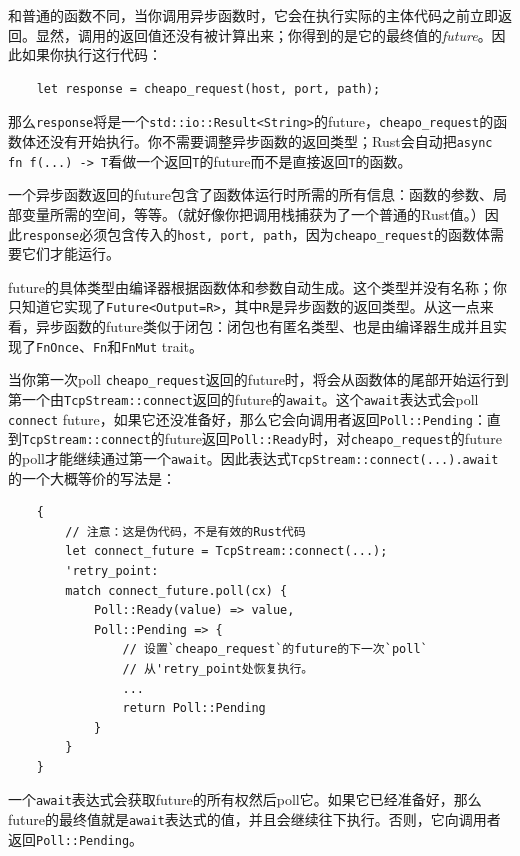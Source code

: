 和普通的函数不同，当你调用异步函数时，它会在执行实际的主体代码之前立即返回。显然，调用的返回值还没有被计算出来；你得到的是它的最终值的\emph{future}。因此如果你执行这行代码：
\begin{verbatim}
    let response = cheapo_request(host, port, path);
\end{verbatim}

那么\texttt{response}将是一个\texttt{std::io::Result<String>}的future，\texttt{cheapo\_request}的函数体还没有开始执行。你不需要调整异步函数的返回类型；Rust会自动把\texttt{async fn f(...) -> T}看做一个返回\texttt{T}的future而不是直接返回\texttt{T}的函数。

一个异步函数返回的future包含了函数体运行时所需的所有信息：函数的参数、局部变量所需的空间，等等。（就好像你把调用栈捕获为了一个普通的Rust值。）因此\texttt{response}必须包含传入的\texttt{host, port, path}，因为\texttt{cheapo\_request}的函数体需要它们才能运行。

future的具体类型由编译器根据函数体和参数自动生成。这个类型并没有名称；你只知道它实现了\texttt{Future<Output=R>}，其中\texttt{R}是异步函数的返回类型。从这一点来看，异步函数的future类似于闭包：闭包也有匿名类型、也是由编译器生成并且实现了\texttt{FnOnce}、\texttt{Fn}和\texttt{FnMut} trait。

当你第一次poll \texttt{cheapo\_request}返回的future时，将会从函数体的尾部开始运行到第一个由\texttt{TcpStream::connect}返回的future的\texttt{await}。这个\texttt{await}表达式会poll \texttt{connect} future，如果它还没准备好，那么它会向调用者返回\texttt{Poll::Pending}：直到\texttt{TcpStream::connect}的future返回\texttt{Poll::Ready}时，对\texttt{cheapo\_request}的future的poll才能继续通过第一个\texttt{await}。因此表达式\texttt{TcpStream::connect(...).await}的一个大概等价的写法是：
\begin{verbatim}
    {
        // 注意：这是伪代码，不是有效的Rust代码
        let connect_future = TcpStream::connect(...);
        'retry_point:
        match connect_future.poll(cx) {
            Poll::Ready(value) => value,
            Poll::Pending => {
                // 设置`cheapo_request`的future的下一次`poll`
                // 从'retry_point处恢复执行。
                ...
                return Poll::Pending
            }
        }
    }
\end{verbatim}

一个\texttt{await}表达式会获取future的所有权然后poll它。如果它已经准备好，那么future的最终值就是\texttt{await}表达式的值，并且会继续往下执行。否则，它向调用者返回\texttt{Poll::Pending}。

